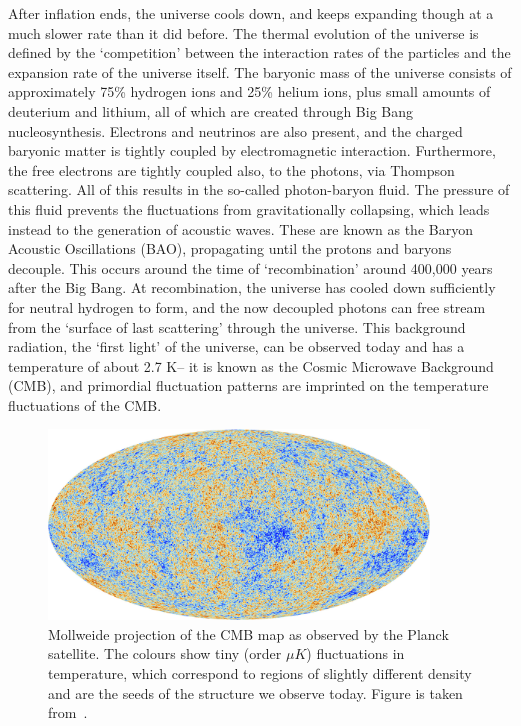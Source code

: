 After inflation ends, the universe cools down, and keeps expanding though at a much slower rate than it did before. The thermal evolution of the universe is defined by the `competition' between the interaction rates of the particles and the expansion rate of the universe itself. The baryonic mass of the universe consists of approximately 75\% hydrogen ions and 25\% helium ions, plus small amounts of deuterium and lithium, all of which are created through Big Bang nucleosynthesis. Electrons and neutrinos are also present, and the charged baryonic matter is tightly coupled by electromagnetic interaction. Furthermore, the free electrons are tightly coupled also, to the photons, via Thompson scattering. All of this results in the so-called photon-baryon fluid. The pressure of this fluid prevents the fluctuations from gravitationally collapsing, which leads instead to the generation of acoustic waves. These are known as the Baryon Acoustic Oscillations (BAO), propagating until the protons and baryons decouple. This occurs around the time of `recombination' around 400,000 years after the Big Bang. At recombination, the universe has cooled down sufficiently for neutral hydrogen to form, and the now decoupled photons can free stream from the `surface of last scattering' through the universe. This background radiation, the `first light' of the universe, can be observed today and has a temperature of about 2.7 K-- it is known as the Cosmic Microwave Background (CMB), and primordial fluctuation patterns are imprinted on the temperature fluctuations of the CMB. 
\begin{figure}[!ht]
	\centering
	\includegraphics[width=0.9\textwidth]{fig/Planck_CMB.jpg}
	\caption{Mollweide projection of the CMB map as observed by the Planck satellite. The colours show tiny (order $\mu K$) fluctuations in temperature, which correspond to regions of slightly different density and are the seeds of the structure we observe today. Figure is taken from~\cite{ESA:2013cmb}.}
\end{figure}

